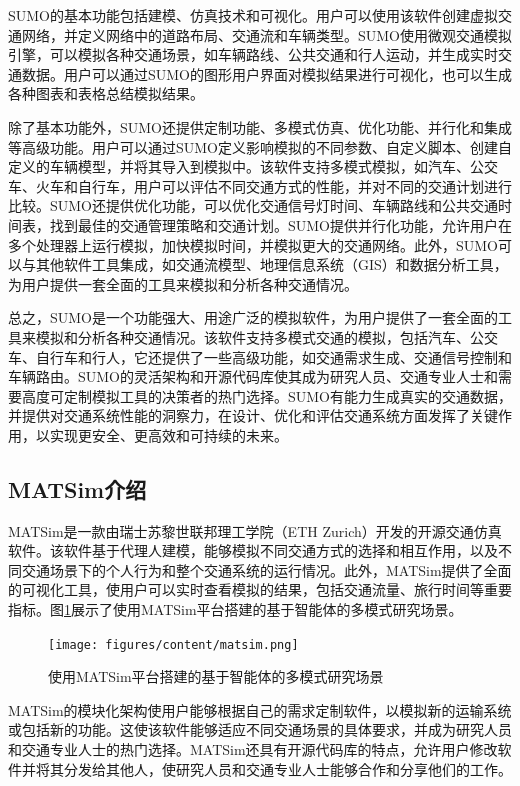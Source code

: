 SUMO的基本功能包括建模、仿真技术和可视化。用户可以使用该软件创建虚拟交通网络，并定义网络中的道路布局、交通流和车辆类型。SUMO使用微观交通模拟引擎，可以模拟各种交通场景，如车辆路线、公共交通和行人运动，并生成实时交通数据。用户可以通过SUMO的图形用户界面对模拟结果进行可视化，也可以生成各种图表和表格总结模拟结果。

除了基本功能外，SUMO还提供定制功能、多模式仿真、优化功能、并行化和集成等高级功能。用户可以通过SUMO定义影响模拟的不同参数、自定义脚本、创建自定义的车辆模型，并将其导入到模拟中。该软件支持多模式模拟，如汽车、公交车、火车和自行车，用户可以评估不同交通方式的性能，并对不同的交通计划进行比较。SUMO还提供优化功能，可以优化交通信号灯时间、车辆路线和公共交通时间表，找到最佳的交通管理策略和交通计划。SUMO提供并行化功能，允许用户在多个处理器上运行模拟，加快模拟时间，并模拟更大的交通网络。此外，SUMO可以与其他软件工具集成，如交通流模型、地理信息系统（GIS）和数据分析工具，为用户提供一套全面的工具来模拟和分析各种交通情况。

总之，SUMO是一个功能强大、用途广泛的模拟软件，为用户提供了一套全面的工具来模拟和分析各种交通情况。该软件支持多模式交通的模拟，包括汽车、公交车、自行车和行人，它还提供了一些高级功能，如交通需求生成、交通信号控制和车辆路由。SUMO的灵活架构和开源代码库使其成为研究人员、交通专业人士和需要高度可定制模拟工具的决策者的热门选择。SUMO有能力生成真实的交通数据，并提供对交通系统性能的洞察力，在设计、优化和评估交通系统方面发挥了关键作用，以实现更安全、更高效和可持续的未来。

\subsection{MATSim介绍}

MATSim是一款由瑞士苏黎世联邦理工学院（ETH Zurich）开发的开源交通仿真软件。该软件基于代理人建模，能够模拟不同交通方式的选择和相互作用，以及不同交通场景下的个人行为和整个交通系统的运行情况。此外，MATSim提供了全面的可视化工具，使用户可以实时查看模拟的结果，包括交通流量、旅行时间等重要指标。图\ref{matsim}展示了使用MATSim平台搭建的基于智能体的多模式研究场景。
\begin{figure}[htbp]
  \centering
  \texttt{[image: figures/content/matsim.png]}
  \caption{使用MATSim平台搭建的基于智能体的多模式研究场景}
  \label{matsim}
\end{figure}


MATSim的模块化架构使用户能够根据自己的需求定制软件，以模拟新的运输系统或包括新的功能。这使该软件能够适应不同交通场景的具体要求，并成为研究人员和交通专业人士的热门选择。MATSim还具有开源代码库的特点，允许用户修改软件并将其分发给其他人，使研究人员和交通专业人士能够合作和分享他们的工作。

